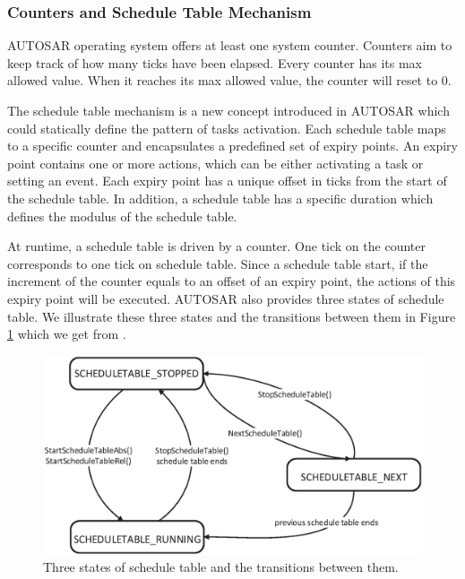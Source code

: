 \documentclass[sigconf]{acmart}
\begin{document}
\subsubsection{Counters and Schedule Table Mechanism}

AUTOSAR operating system offers at least one system counter. Counters aim to keep track of how many ticks have been elapsed. Every counter has its max allowed value. When it reaches its max allowed value, the counter will reset to 0.

The schedule table mechanism is a new concept introduced in AUTOSAR which could statically define the pattern of tasks activation. Each schedule table maps to a specific counter and encapsulates a predefined set of expiry points. An expiry point contains one or more actions, which can be either activating a task or setting an event. Each expiry point has a unique offset in ticks from the start of the schedule table. In addition, a schedule table has a specific duration which defines the modulus of the schedule table.

At runtime, a schedule table is driven by a counter. One tick on the counter corresponds to one tick on schedule table. Since a schedule table start, if the increment of the counter equals to an offset of an expiry point, the actions of this expiry point will be executed. AUTOSAR also provides three states of schedule table. We illustrate these three states and the transitions between them in Figure \ref{figure_state_st} which we get from \cite{autosar}.

\begin{figure}[t]
\centering
\includegraphics[scale=.39]{graphics/Figure_state_st.eps}
\caption{Three states of schedule table and the transitions between them.}
\label{figure_state_st}
\end{figure}
\end{document}
